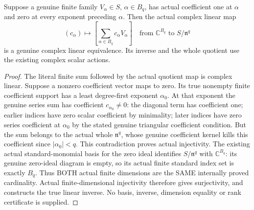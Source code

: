 \begin{lemma}
\label{hir:actual-finite-jet-triangular-series-basis}
Suppose a genuine finite family $V_\alpha\in S$, $\alpha\in B_q$,
has actual coefficient one at $\alpha$ and zero at every exponent
preceding $\alpha$. Then the actual complex linear map
\[
 (c_\alpha)\longmapsto\left[\sum_{\alpha\in B_q}c_\alpha V_\alpha\right]
 \quad\text{from }\mathbb C^{B_q}\text{ to }S/\mathfrak n^q
\]
is a genuine complex linear equivalence. Its inverse and the whole
quotient use the existing complex scalar actions.
\leanok
\end{lemma}
\begin{proof}
The literal finite sum followed by the actual quotient map is complex
linear. Suppose a nonzero coefficient vector maps to zero. Its true
nonempty finite coefficient support has a least degree-first exponent
$\alpha_0$. At that exponent the genuine series sum has coefficient
$c_{\alpha_0}\ne0$: the diagonal term has coefficient one; earlier
indices have zero scalar coefficient by minimality; later indices have
zero series coefficient at $\alpha_0$ by the stated genuine triangular
coefficient condition. But the sum belongs to the actual whole
$\mathfrak n^q$, whose genuine coefficient kernel kills this coefficient
since $|\alpha_0|<q$. This contradiction proves actual injectivity.
The existing actual standard-monomial basis for the zero ideal identifies
$S/\mathfrak n^q$ with $\mathbb C^{B_q}$: its genuine zero-ideal diagram
is empty, so its actual finite standard index set is exactly $B_q$.
Thus BOTH actual finite dimensions are the SAME internally proved
cardinality. Actual finite-dimensional injectivity therefore gives
surjectivity, and constructs the true linear inverse. No basis,
inverse, dimension equality or rank certificate is supplied.
\end{proof}

